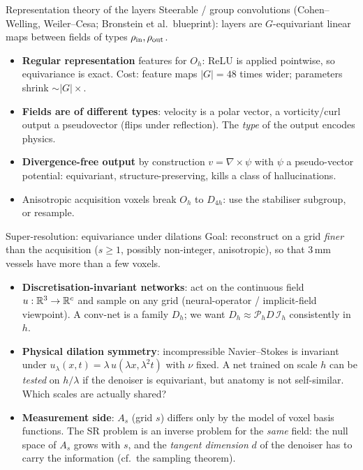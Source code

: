 \iflong
\begin{frame}{Representation theory of the layers}
Steerable / group convolutions (Cohen--Welling, Weiler--Cesa; Bronstein et al.\ blueprint): layers are $G$-equivariant linear maps between fields of types $\rho_{\rm in},\rho_{\rm out}$.
\begin{itemize}
\item \textbf{Regular representation} features for $O_h$: ReLU is applied pointwise, so equivariance is exact. Cost: feature maps $|G|=48$ times wider; parameters shrink $\sim|G|\times$.
\item \textbf{Fields are of different types}: velocity is a polar vector, a vorticity/curl output a pseudovector (flips under reflection). The \emph{type} of the output encodes physics.
\item \textbf{Divergence-free output} by construction $v=\nabla\times\psi$ with $\psi$ a pseudo-vector potential: equivariant, structure-preserving, kills a class of hallucinations.
\item Anisotropic acquisition voxels break $O_h$ to $D_{4h}$: use the stabiliser subgroup, or resample.
\end{itemize}
\end{frame}
\fi

\begin{frame}{Super-resolution: equivariance under dilations}
\small
Goal: reconstruct on a grid \emph{finer} than the acquisition ($s\ge1$, possibly non-integer, anisotropic), so that 3\,mm vessels have more than a few voxels.
\pause
\begin{itemize}
\item \textbf{Discretisation-invariant networks}: act on the continuous field $u:\mathbb R^3\to\mathbb R^c$ and sample on any grid (neural-operator / implicit-field viewpoint). A conv-net is a family $D_h$; we want $D_{h}\approx\mathcal P_h D\,\mathcal I_h$ consistently in $h$.
\item \textbf{Physical dilation symmetry}: incompressible Navier--Stokes is invariant under $u_\lambda(x,t)=\lambda\,u(\lambda x,\lambda^2t)$ with $\nu$ fixed. A net trained on scale $h$ can be \emph{tested} on $h/\lambda$ if the denoiser is equivariant, but anatomy is not self-similar. Which scales are actually shared?
\item \textbf{Measurement side}: $A_s$ (grid $s$) differs only by the model of voxel basis functions. The SR problem is an inverse problem for the \emph{same} field: the null space of $A_s$ grows with $s$, and the \emph{tangent dimension} $d$ of the denoiser has to carry the information (cf.\ the sampling theorem).
\end{itemize}
\end{frame}

